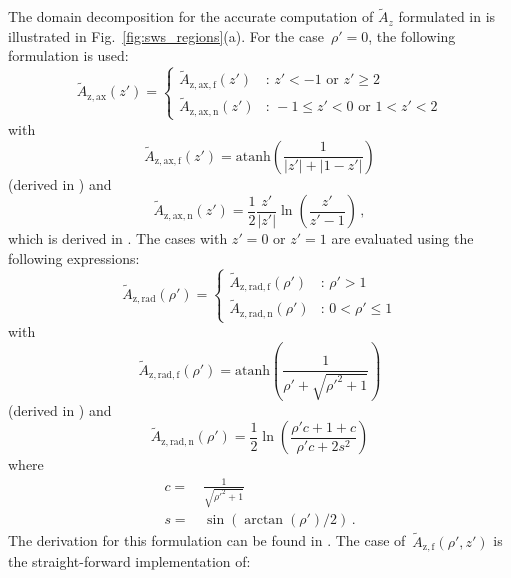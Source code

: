 The domain decomposition for the accurate computation of $\tilde{A}_z$
formulated in  is illustrated in Fig.~\ref{fig:sws_regions}(a).
For the case~$\rho'=0$, the following formulation is used:
\begin{equation}
  \tilde{A}_\mathrm{z,ax} (z') =
  \begin{cases}
    \tilde{A}_\mathrm{z,ax,f} (z') &:\, z' < -1 \textrm{ or } z' \geq 2 \\
    \tilde{A}_\mathrm{z,ax,n} (z') &:\, -1 \leq z' < 0 \textrm{ or } 1 < z' < 2
  \end{cases}
\end{equation}
with
\begin{equation}
  \tilde{A}_\mathrm{z,ax,f} (z') = \textrm{atanh}\left( \frac{1}{|z'| + |1 - z'|} \right) \label{eqn:sws_A_z_ax_f}
\end{equation}
(derived in )
and
\begin{equation}
  \tilde{A}_\mathrm{z,ax,n} (z') = \frac{1}{2} \frac{z'}{|z'|} \ln \left(\frac{z'}{z' - 1}\right) \label{eqn:sws_A_z_ax_n} \, ,
\end{equation}
which is derived in .
The cases with $z'=0$ or $z'=1$ are evaluated using the following expressions:
\begin{equation}
  \tilde{A}_\mathrm{z,rad} (\rho') =
  \begin{cases}
    \tilde{A}_\mathrm{z,rad,f} (\rho') &:\, \rho' > 1 \\
    \tilde{A}_\mathrm{z,rad,n} (\rho') &:\, 0 < \rho' \leq 1
  \end{cases}
\end{equation}
with
\begin{equation}
  \tilde{A}_\mathrm{z,rad,f} (\rho') = \textrm{atanh}\left( \frac{1}{\rho' + \sqrt{{\rho'}^2 + 1}} \right) \label{eqn:sws_A_z_rad_f}
\end{equation}
(derived in )
and
\begin{equation}
  \tilde{A}_\mathrm{z,rad,n} (\rho') = \frac{1}{2} \ln \left(\frac{\rho' c + 1 + c}{\rho' c + 2 s^2 }\right) \label{eqn:sws_A_z_rad_n}
\end{equation}
where
\begin{align}
  c =&\, \frac{1}{\sqrt{{\rho'}^2 + 1}} \\
  s =&\, \sin(\arctan(\rho')/2) \, .
\end{align}
The derivation for this formulation can be found in .
The case of~$\tilde{A}_\mathrm{z,f}(\rho', z')$ is the straight-forward implementation of:
